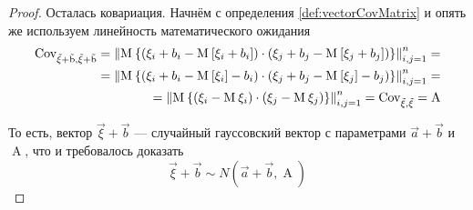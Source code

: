 \begin{proof}
  Осталась ковариация. Начнём с определения \ref{def:vectorCovMatrix} и опять же
  используем линейность математического ожидания
  \begin{align*}
      \operatorname{Cov^{}_{\vec{\xi} + \vec{b}, \vec{\xi} + \vec{b}}}
      = \left\| \operatorname{M}_{} 
      \left\{ \left( \xi_i + b_i - \operatorname{M}_{} \left[ \xi_i + b_i \right] \right)
          \cdot \left( \xi_j + b_j - \operatorname{M}_{} \left[ \xi_j + b_j \right] \right)
      \right\} \right\|_{i,j=1}^n = \\
      = \left\| \operatorname{M}_{} 
      \left\{ \left( \xi_i + b_i - \operatorname{M}_{} \left[ \xi_i \right] - b_i \right)
          \cdot \left( \xi_j + b_j - \operatorname{M}_{} \left[ \xi_j \right] - b_j \right)
      \right\} \right\|_{i,j=1}^n = \\
      = \left\| \operatorname{M}_{} 
      \left\{ \left( \xi_i - \operatorname{M}_{} \xi_i \right)
          \cdot \left( \xi_j - \operatorname{M}_{} \xi_j \right)
      \right\} \right\|_{i,j=1}^n
      = \operatorname{Cov^{}_{\vec{\xi}, \vec{\xi}}} = \operatorname{A}
  \end{align*}

  То есть, вектор $\vec{\xi} + \vec{b}$ --- случайный гауссовский вектор с
  параметрами $\vec{a} + \vec{b}$ и $\operatorname{A}$, что и требовалось доказать
  $$\vec{\xi} + \vec{b} \sim N\left( \vec{a} + \vec{b}, \operatorname{A} \right)$$
\end{proof}

